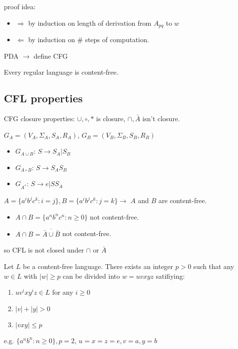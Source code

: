 proof idea: 
\begin{itemize}
    \item $\Rightarrow$ by induction on length of derivation from $A_{pq}$ to $w$
    \item $\Leftarrow$ by induction on \# steps of computation. 
\end{itemize}

PDA $\to$ define CFG

\begin{theorem}
    Every regular language is content-free. 
\end{theorem}

\subsection{CFL properties}
CFG closure properties: $\cup,\circ,*$ is closure, $\cap,\bar{A}$ isn't closure. 

$G_A=(V_A,\Sigma_A,S_A,R_A)$, $G_B=(V_B,\Sigma_B,S_B,R_B)$
\begin{itemize}
    \item $G_{A\cup B}$: $S\to S_A | S_B$
    \item $G_{A\circ B}$: $S\to S_AS_B$
    \item $G_{A^*}$: $S\to e|SS_A$
\end{itemize}

$A=\{ a^ib^jc^k:i=j \}, B=\{ a^ib^jc^k : j=k\} \to $ $A$ and $B$ are content-free. 
\begin{itemize}
    \item $A\cap B=\{ a^nb^nc^n:n\ge 0 \}$ not content-free.
    \item $A\cap B=\overline{\bar{A}\cup \bar{B}}$ not content-free.
\end{itemize}
so CFL is not closed under $\cap$ or $\bar{A}$

\begin{theorem}
    Let $L$ be a content-free language. There exists an integer $p>0$ such that any $w\in L$ with $|w|\ge p$ can be divided into $w=uvxyz$ satifiying:
    \begin{enumerate}
        \item $uv^ixy^iz\in L$ for any $i\ge 0$
        \item $|v|+|y|>0$
        \item $|vxy|\le p$
    \end{enumerate}
\end{theorem}

e.g. $\{ a^n b^n:n\ge 0 \}, p=2$, $u=x=z=e, v=a, y=b$ 

